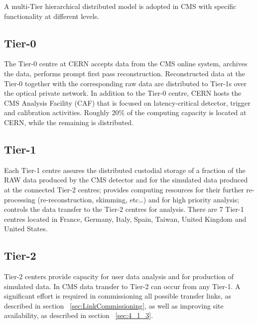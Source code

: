 A multi-Tier hierarchical distributed model is adopted in CMS with specific functionality at different levels.
\subsection{Tier-0}
\label{sec:2_1}
The Tier-0 centre at CERN accepts data from the CMS online system, archives the data, performs prompt first pass reconstruction. Reconstructed data at the Tier-0 together with the corresponding raw data are distributed to Tier-1s over the optical private network. In addition to the Tier-0 centre, CERN hosts the CMS Analysis Facility (CAF) that is focused on latency-critical detector, trigger and calibration activities.
Roughly 20\% of the computing capacity is located at CERN, while the remaining is distributed.

\subsection{Tier-1}
\label{sec:2_2}
Each Tier-1 centre assures the distributed custodial storage of a fraction of the RAW data produced by the CMS detector and for the simulated data produced at the connected Tier-2 centres; provides computing resources for their further re-processing (re-reconstruction, skimming, etc…) and for high priority analysis; controls the data transfer to the Tier-2 centres for analysis. There are 7 Tier-1 centres located in France, Germany, Italy, Spain, Taiwan, United Kingdom and United States.


\subsection{Tier-2}
\label{sec:2_3}
Tier-2 centers provide capacity for user data analysis and for production of simulated data.
In CMS data transfer to Tier-2 can occur from any Tier-1. A significant effort is required in 
commissioning all possible transfer links, as described in section ~\ref{sec:LinkCommissioning}, as well
as improving site availability, as described in section ~\ref{sec:4_1_3}.

